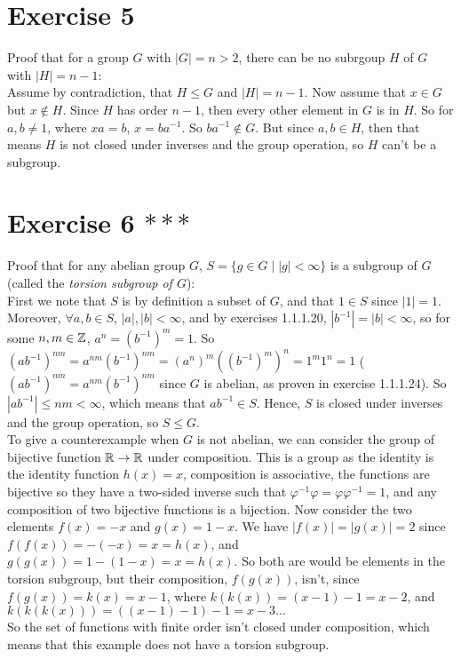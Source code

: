 \documentclass[12pt]{article}
\begin{document}
    \section*{Exercise 5}
    Proof that for a group $G$ with $|G| = n > 2$,
    there can be no subrgoup $H$ of $G$ with $|H| = n-1$: \\
    Assume by contradiction, that $H \leqslant G$ and $|H| = n-1$.
    Now assume that $x \in G$ but $x \notin H$.
    Since $H$ has order $n - 1$, then every other element in $G$ is in $H$.
    So for $a, b \neq 1$, where $xa = b$, $x = ba^{-1}$.
    So $ba^{-1} \notin G$.
    But since $a, b \in H$,
    then that means $H$ is not closed under inverses and the group operation,
    so $H$ can't be a subgroup.


    \section*{Exercise 6 $***$}
    Proof that for any abelian group $G$,
    $S = \{g \in G \mid |g| < \infty\}$ is a subgroup of $G$
    (called the \textit{torsion subgroup of $G$}): \\
    First we note that $S$ is by definition a subset of $G$,
    and that $1 \in S$ since $|1| = 1$. 
    Moreover, $\forall a, b \in S$, $|a|, |b| < \infty$,
    and by exercises 1.1.1.20, $|b^{-1}| = |b| < \infty$,
    so for some $n, m \in \mathbb{Z}$, $a^n = (b^{-1})^m = 1$.
    So $(ab^{-1})^{nm} = a^{nm}(b^{-1})^{nm}
    = (a^n)^m((b^{-1})^m)^n
    = 1^m1^n
    = 1$
    ($(ab^{-1})^{nm} = a^{nm}(b^{-1})^{nm}$ since $G$ is abelian,
    as proven in exercise 1.1.1.24).
    So $|ab^{-1}| \leqslant nm < \infty$,
    which means that $ab^{-1} \in S$.
    Hence, $S$ is closed under inverses and the group operation,
    so $S \leqslant G$. \\
    To give a counterexample when $G$ is not abelian,
    we can consider the group of bijective function $\mathbb{R} \to \mathbb{R}$
    under composition.
    This is a group as the identity is the identity function $h(x) = x$,
    composition is associative,
    the functions are bijective so they have a two-sided inverse
    such that $\varphi^{-1}\varphi = \varphi\varphi^{-1} = 1$,
    and any composition of two bijective functions is a bijection.
    Now consider the two elements $f(x) = -x$ and $g(x) = 1 - x$.
    We have $|f(x)| = |g(x)| = 2$
    since $f(f(x)) = -(-x) = x = h(x)$,
    and $g(g(x)) = 1 - (1 - x) = x = h(x)$.
    So both are would be elements in the torsion subgroup,
    but their composition, $f(g(x))$, isn't,
    since $f(g(x)) = k(x) = x - 1$, 
    where $k(k(x)) = (x - 1) - 1 = x - 2$,
    and $k(k(k(x))) = ((x - 1) - 1) - 1 = x - 3 \dots$ \\
    So the set of functions with finite order isn't closed under composition,
    which means that this example does not have a torsion subgroup.
\end{document}
